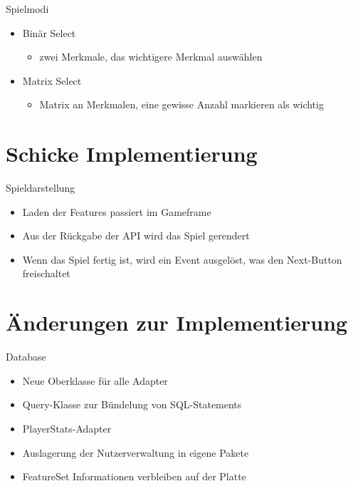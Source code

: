 \documentclass[xcolor=dvipsnames]{beamer}
\begin{document}
    \begin{frame}{Spielmodi}
        \begin{itemize}
            \item Binär Select 
                \begin{itemize}
                    \item zwei Merkmale, das wichtigere Merkmal auswählen
                \end{itemize}
            \item Matrix Select
                \begin{itemize}
                    \item Matrix an Merkmalen, eine gewisse Anzahl markieren als wichtig
                \end{itemize}
        \end{itemize}
    \end{frame}
    \section{Schicke Implementierung}
    \begin{frame}{Spieldarstellung}
        \begin{itemize}
            \item Laden der Features passiert im Gameframe
            \item Aus der Rückgabe der API wird das Spiel gerendert
            \item Wenn das Spiel fertig ist, wird ein Event ausgelöst, was den Next-Button freischaltet
        \end{itemize}
    \end{frame}

    \section{Änderungen zur Implementierung}
    \begin{frame}{Database}
        \begin{itemize}
            \item Neue Oberklasse für alle Adapter
            \item Query-Klasse zur Bündelung von SQL-Statements
            \item PlayerStats-Adapter
            \item Auslagerung der Nutzerverwaltung in eigene Pakete
            \item FeatureSet Informationen verbleiben auf der Platte
        \end{itemize}
    \end{frame}
\end{document}
